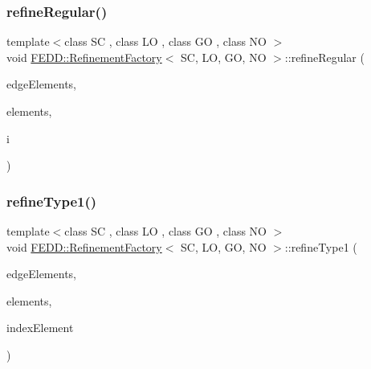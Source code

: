 \subsubsection{\texorpdfstring{refine\+Regular()}{refineRegular()}}
{\footnotesize\ttfamily template$<$class SC , class LO , class GO , class NO $>$ \\
void \hyperlink{classFEDD_1_1RefinementFactory}{F\+E\+D\+D\+::\+Refinement\+Factory}$<$ SC, LO, GO, NO $>$\+::refine\+Regular (\begin{DoxyParamCaption}\item[{\hyperlink{classFEDD_1_1RefinementFactory_ae5285e990ec4632d6188a1280627ad13}{Edge\+Elements\+Ptr\+\_\+\+Type}}]{edge\+Elements,  }\item[{\hyperlink{classFEDD_1_1RefinementFactory_a0994b5b7b6d080048673941251999f2e}{Elements\+Ptr\+\_\+\+Type}}]{elements,  }\item[{int}]{i }\end{DoxyParamCaption})}

\mbox{\label{classFEDD_1_1RefinementFactory_a89b2f7d45585b804e32b278b83954153}} 
\subsubsection{\texorpdfstring{refine\+Type1()}{refineType1()}}
{\footnotesize\ttfamily template$<$class SC , class LO , class GO , class NO $>$ \\
void \hyperlink{classFEDD_1_1RefinementFactory}{F\+E\+D\+D\+::\+Refinement\+Factory}$<$ SC, LO, GO, NO $>$\+::refine\+Type1 (\begin{DoxyParamCaption}\item[{\hyperlink{classFEDD_1_1RefinementFactory_ae5285e990ec4632d6188a1280627ad13}{Edge\+Elements\+Ptr\+\_\+\+Type}}]{edge\+Elements,  }\item[{\hyperlink{classFEDD_1_1RefinementFactory_a0994b5b7b6d080048673941251999f2e}{Elements\+Ptr\+\_\+\+Type}}]{elements,  }\item[{int}]{index\+Element }\end{DoxyParamCaption})}

\mbox{\label{classFEDD_1_1RefinementFactory_ac43c76ce4137963ac5aac1355d38dbac}} 
